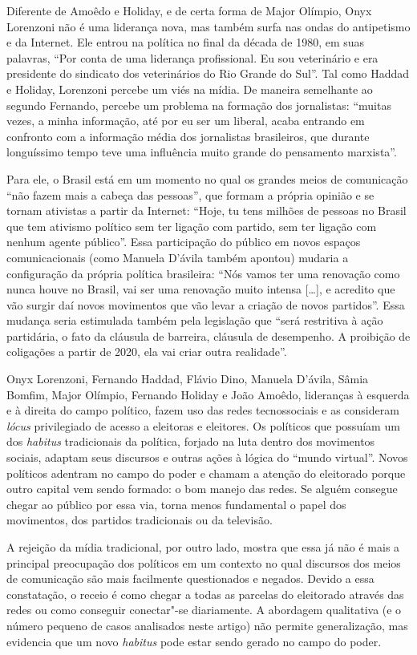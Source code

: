 Diferente de Amoêdo e Holiday, e de certa forma de Major Olímpio, Onyx
Lorenzoni não é uma liderança nova, mas também surfa nas ondas do
antipetismo e da Internet. Ele entrou na política no final da década de
1980, em suas palavras, ``Por conta de uma liderança profissional. Eu
sou veterinário e era presidente do sindicato dos veterinários do Rio
Grande do Sul''. Tal como Haddad e Holiday, Lorenzoni percebe um viés na
mídia. De maneira semelhante ao segundo Fernando, percebe um problema na
formação dos jornalistas: ``muitas vezes, a minha informação, até por eu
ser um liberal, acaba entrando em confronto com a informação média dos
jornalistas brasileiros, que durante longuíssimo tempo teve uma
influência muito grande do pensamento marxista''.

Para ele, o Brasil está em um momento no qual os grandes meios de
comunicação ``não fazem mais a cabeça das pessoas'', que formam a
própria opinião e se tornam ativistas a partir da Internet: ``Hoje, tu
tens milhões de pessoas no Brasil que tem ativismo político sem ter
ligação com partido, sem ter ligação com nenhum agente público''. Essa
participação do público em novos espaços comunicacionais (como Manuela
D'ávila também apontou) mudaria a configuração da própria política
brasileira: ``Nós vamos ter uma renovação como nunca houve no Brasil,
vai ser uma renovação muito intensa {[}\ldots{}{]}, e acredito que vão surgir
daí novos movimentos que vão levar a criação de novos partidos''. Essa
mudança seria estimulada também pela legislação que ``será restritiva à
ação partidária, o fato da cláusula de barreira, cláusula de desempenho.
A proibição de coligações a partir de 2020, ela vai criar outra
realidade''.

Onyx Lorenzoni, Fernando Haddad, Flávio Dino, Manuela D'ávila, Sâmia
Bomfim, Major Olímpio, Fernando Holiday e João Amoêdo, lideranças à
esquerda e à direita do campo político, fazem uso das redes
tecnossociais e as consideram \emph{lócus} privilegiado de acesso a
eleitoras e eleitores. Os políticos que possuíam um dos \emph{habitus}
tradicionais da política, forjado na luta dentro dos movimentos sociais,
adaptam seus discursos e outras ações à lógica do ``mundo virtual''.
Novos políticos adentram no campo do poder e chamam a atenção do
eleitorado porque outro capital vem sendo formado: o bom manejo das
redes. Se alguém consegue chegar ao público por essa via, torna menos
fundamental o papel dos movimentos, dos partidos tradicionais ou da
televisão.

A rejeição da mídia tradicional, por outro lado, mostra que essa já não
é mais a principal preocupação dos políticos em um contexto no qual
discursos dos meios de comunicação são mais facilmente questionados e
negados. Devido a essa constatação, o receio é como chegar a todas as
parcelas do eleitorado através das redes ou como conseguir conectar"-se
diariamente. A abordagem qualitativa (e o número pequeno de casos
analisados neste artigo) não permite generalização, mas evidencia que um
novo \emph{habitus} pode estar sendo gerado no campo do poder.

